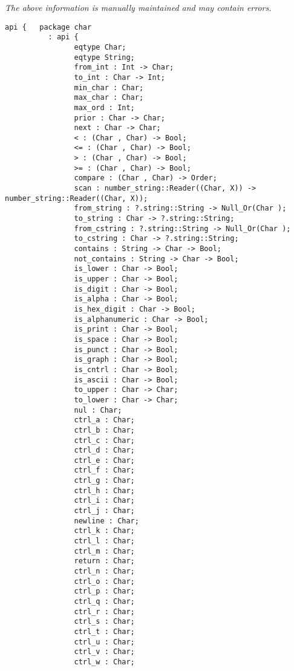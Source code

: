 \label{api:Text}

{\tiny \it The above information is manually maintained and may contain errors.}
\begin{verbatim}
api {   package char
          : api {
                eqtype Char;
                eqtype String;
                from_int : Int -> Char;
                to_int : Char -> Int;
                min_char : Char;
                max_char : Char;
                max_ord : Int;
                prior : Char -> Char;
                next : Char -> Char;
                < : (Char , Char) -> Bool;
                <= : (Char , Char) -> Bool;
                > : (Char , Char) -> Bool;
                >= : (Char , Char) -> Bool;
                compare : (Char , Char) -> Order;
                scan : number_string::Reader((Char, X)) -> number_string::Reader((Char, X));
                from_string : ?.string::String -> Null_Or(Char );
                to_string : Char -> ?.string::String;
                from_cstring : ?.string::String -> Null_Or(Char );
                to_cstring : Char -> ?.string::String;
                contains : String -> Char -> Bool;
                not_contains : String -> Char -> Bool;
                is_lower : Char -> Bool;
                is_upper : Char -> Bool;
                is_digit : Char -> Bool;
                is_alpha : Char -> Bool;
                is_hex_digit : Char -> Bool;
                is_alphanumeric : Char -> Bool;
                is_print : Char -> Bool;
                is_space : Char -> Bool;
                is_punct : Char -> Bool;
                is_graph : Char -> Bool;
                is_cntrl : Char -> Bool;
                is_ascii : Char -> Bool;
                to_upper : Char -> Char;
                to_lower : Char -> Char;
                nul : Char;
                ctrl_a : Char;
                ctrl_b : Char;
                ctrl_c : Char;
                ctrl_d : Char;
                ctrl_e : Char;
                ctrl_f : Char;
                ctrl_g : Char;
                ctrl_h : Char;
                ctrl_i : Char;
                ctrl_j : Char;
                newline : Char;
                ctrl_k : Char;
                ctrl_l : Char;
                ctrl_m : Char;
                return : Char;
                ctrl_n : Char;
                ctrl_o : Char;
                ctrl_p : Char;
                ctrl_q : Char;
                ctrl_r : Char;
                ctrl_s : Char;
                ctrl_t : Char;
                ctrl_u : Char;
                ctrl_v : Char;
                ctrl_w : Char;

\end{verbatim}
